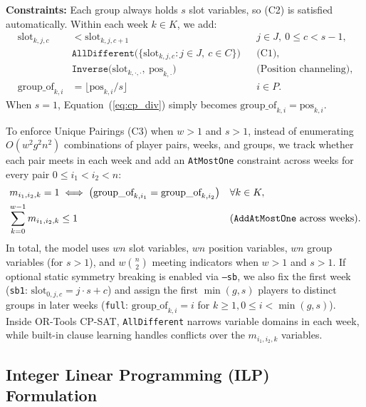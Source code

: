 \documentclass[a4paper,fleqn]{cas-sc}
\begin{document}
\noindent\textbf{Constraints:} Each group always holds $s$ slot variables, so (C2) is satisfied automatically. Within each week $k \in K$, we add:
\begin{align}
    \text{slot}_{k,j,c} &< \text{slot}_{k,j,c+1}
      && j \in J,\ 0\le c<s-1, \label{eq:cp_order} \\
    &\texttt{AllDifferent}\big(\{\text{slot}_{k,j,c} : j \in J,\ c \in C\}\big)
      && \text{(C1)}, \label{eq:cp_alldiff} \\
    &\texttt{Inverse}\big(\text{slot}_{k,\cdot,\cdot},\ \text{pos}_{k,\cdot}\big)
      && \text{(Position channeling)}, \label{eq:cp_inverse} \\
    \text{group\_of}_{k,i} &= \lfloor \text{pos}_{k,i} / s \rfloor
      && i \in P. \label{eq:cp_div}
\end{align}
When $s = 1$, Equation~(\ref{eq:cp_div}) simply becomes $\text{group\_of}_{k,i} = \text{pos}_{k,i}$.

To enforce Unique Pairings (C3) when $w > 1$ and $s > 1$, instead of enumerating $O(w^2 g^2 n^2)$ combinations of player pairs, weeks, and groups, we track whether each pair meets in each week and add an \texttt{AtMostOne} constraint across weeks for every pair $0 \le i_1 < i_2 < n$:
\begin{align}
    m_{i_1,i_2,k} = 1 &\iff \big(\text{group\_of}_{k,i_1} = \text{group\_of}_{k,i_2}\big) && \forall k \in K, \label{eq:cp_reify} \\
    \sum_{k=0}^{w-1} m_{i_1,i_2,k} &\le 1 && \text{(\texttt{AddAtMostOne} across weeks)}. \label{eq:cp_social}
\end{align}
In total, the model uses $w n$ slot variables, $w n$ position variables, $w n$ group variables (for $s > 1$), and $w \binom{n}{2}$ meeting indicators when $w>1$ and $s>1$. If optional static symmetry breaking is enabled via \texttt{--sb}, we also fix the first week (\texttt{sb1}: $\text{slot}_{0,j,c} = j \cdot s + c$) and assign the first $\min(g, s)$ players to distinct groups in later weeks (\texttt{full}: $\text{group\_of}_{k,i} = i$ for $k \ge 1, 0 \le i < \min(g, s)$). Inside OR-Tools CP-SAT, \texttt{AllDifferent} narrows variable domains in each week, while built-in clause learning handles conflicts over the $m_{i_1,i_2,k}$ variables.

\subsection{Integer Linear Programming (ILP) Formulation}
\label{sec:ilp_formulation}
\end{document}
